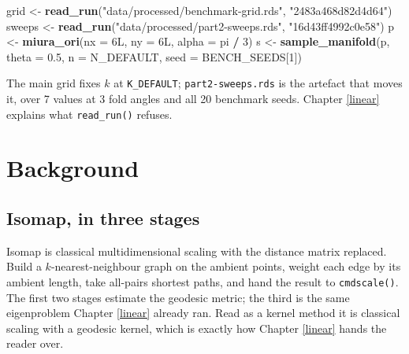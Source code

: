 \documentclass[
  british,
  a4paper,
]{book}
\newenvironment{Shaded}{\begin{snugshade}}{\end{snugshade}}
\newcommand{\AttributeTok}[1]{\textcolor[rgb]{0.13,0.29,0.53}{#1}}
\newcommand{\DataTypeTok}[1]{\textcolor[rgb]{0.13,0.29,0.53}{#1}}
\newcommand{\DecValTok}[1]{\textcolor[rgb]{0.00,0.00,0.81}{#1}}
\newcommand{\FloatTok}[1]{\textcolor[rgb]{0.00,0.00,0.81}{#1}}
\newcommand{\FunctionTok}[1]{\textcolor[rgb]{0.13,0.29,0.53}{\textbf{#1}}}
\newcommand{\NormalTok}[1]{#1}
\newcommand{\OtherTok}[1]{\textcolor[rgb]{0.56,0.35,0.01}{#1}}
\newcommand{\SpecialCharTok}[1]{\textcolor[rgb]{0.81,0.36,0.00}{\textbf{#1}}}
\newcommand{\StringTok}[1]{\textcolor[rgb]{0.31,0.60,0.02}{#1}}
\begin{document}
\begin{Shaded}
\begin{Highlighting}[]
\NormalTok{grid   }\OtherTok{\textless{}{-}} \FunctionTok{read\_run}\NormalTok{(}\StringTok{"data/processed/benchmark{-}grid.rds"}\NormalTok{, }\StringTok{"2483a468d82d4d64"}\NormalTok{)}
\NormalTok{sweeps }\OtherTok{\textless{}{-}} \FunctionTok{read\_run}\NormalTok{(}\StringTok{"data/processed/part2{-}sweeps.rds"}\NormalTok{,  }\StringTok{"16d43ff4992c0e58"}\NormalTok{)}
\NormalTok{p }\OtherTok{\textless{}{-}} \FunctionTok{miura\_ori}\NormalTok{(}\AttributeTok{nx =} \DecValTok{6}\DataTypeTok{L}\NormalTok{, }\AttributeTok{ny =} \DecValTok{6}\DataTypeTok{L}\NormalTok{, }\AttributeTok{alpha =}\NormalTok{ pi }\SpecialCharTok{/} \DecValTok{3}\NormalTok{)}
\NormalTok{s }\OtherTok{\textless{}{-}} \FunctionTok{sample\_manifold}\NormalTok{(p, }\AttributeTok{theta =} \FloatTok{0.5}\NormalTok{, }\AttributeTok{n =}\NormalTok{ N\_DEFAULT, }\AttributeTok{seed =}\NormalTok{ BENCH\_SEEDS[}\DecValTok{1}\NormalTok{])}
\end{Highlighting}
\end{Shaded}

The main grid fixes \(k\) at \texttt{K\_DEFAULT}; \texttt{part2-sweeps.rds} is the artefact that
moves it, over 7 values at
3 fold angles and all 20 benchmark seeds.
Chapter \ref{linear} explains what \texttt{read\_run()} refuses.

\section{Background}\label{geo-background}

\subsection{Isomap, in three stages}\label{isomap-in-three-stages}

Isomap \citep{tenenbaum2000isomap} is classical multidimensional scaling
\citep{torgerson1952mds} with the distance matrix replaced. Build a
\(k\)-nearest-neighbour graph on the ambient points, weight each edge by its
ambient length, take all-pairs shortest paths, and hand the result to
\texttt{cmdscale()}. The first two stages estimate the geodesic metric; the third is the
same eigenproblem Chapter \ref{linear} already ran. Read as a kernel method
\citep{scholkopf1998kernelpca, lee2007nonlinear} it is classical scaling with a
geodesic kernel, which is exactly how Chapter \ref{linear} hands the reader over.
\end{document}
